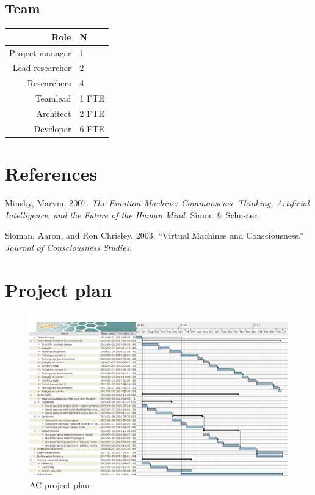 \subsection{Team}\label{team}

\begin{tabular}{|r|l|}
\hline
\textbf{Role} & \textbf{N} \\ \hline
Project manager & 1 \\ \hline
Lead researcher & 2 \\ \hline
Researchers & 4 \\ \hline
Teamlead & 1 FTE \\ \hline 
Architect & 2 FTE \\ \hline
Developer & 6 FTE \\ \hline
\end{tabular}

\section{References}

Minsky, Marvin. 2007. \emph{The Emotion Machine: Commonsense Thinking,
Artificial Intelligence, and the Future of the Human Mind}. Simon \&
Schuster.

Sloman, Aaron, and Ron Chrisley. 2003. ``Virtual Machines and
Consciousness.'' \emph{Journal of Consciousness Studies}.

\section{Project plan}\label{project-plan}

\begin{figure}[htbp]
\centering
\includegraphics[angle=90, width=1.0\textwidth]{iProject_plan.png}
\caption{AC project plan}
\end{figure}
